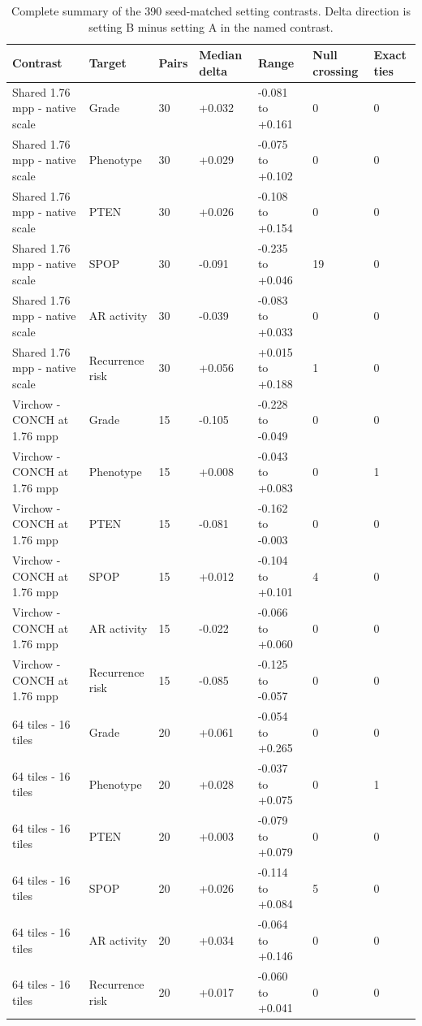 \begin{table}[H]
\centering
\scriptsize
\caption{Complete summary of the 390 seed-matched setting contrasts. Delta direction is setting B minus setting A in the named contrast.}
\label{tab:supp-contrast-summary}
\begin{tabular}{@{}p{}p{}p{}p{}p{}p{}p{}@{}}
\toprule
Contrast & Target & Pairs & Median delta & Range & Null crossing & Exact ties \\
\midrule
Shared 1.76 mpp - native scale & Grade & 30 & +0.032 & -0.081 to +0.161 & 0 & 0 \\
Shared 1.76 mpp - native scale & Phenotype & 30 & +0.029 & -0.075 to +0.102 & 0 & 0 \\
Shared 1.76 mpp - native scale & PTEN & 30 & +0.026 & -0.108 to +0.154 & 0 & 0 \\
Shared 1.76 mpp - native scale & SPOP & 30 & -0.091 & -0.235 to +0.046 & 19 & 0 \\
Shared 1.76 mpp - native scale & AR activity & 30 & -0.039 & -0.083 to +0.033 & 0 & 0 \\
Shared 1.76 mpp - native scale & Recurrence risk & 30 & +0.056 & +0.015 to +0.188 & 1 & 0 \\
Virchow - CONCH at 1.76 mpp & Grade & 15 & -0.105 & -0.228 to -0.049 & 0 & 0 \\
Virchow - CONCH at 1.76 mpp & Phenotype & 15 & +0.008 & -0.043 to +0.083 & 0 & 1 \\
Virchow - CONCH at 1.76 mpp & PTEN & 15 & -0.081 & -0.162 to -0.003 & 0 & 0 \\
Virchow - CONCH at 1.76 mpp & SPOP & 15 & +0.012 & -0.104 to +0.101 & 4 & 0 \\
Virchow - CONCH at 1.76 mpp & AR activity & 15 & -0.022 & -0.066 to +0.060 & 0 & 0 \\
Virchow - CONCH at 1.76 mpp & Recurrence risk & 15 & -0.085 & -0.125 to -0.057 & 0 & 0 \\
64 tiles - 16 tiles & Grade & 20 & +0.061 & -0.054 to +0.265 & 0 & 0 \\
64 tiles - 16 tiles & Phenotype & 20 & +0.028 & -0.037 to +0.075 & 0 & 1 \\
64 tiles - 16 tiles & PTEN & 20 & +0.003 & -0.079 to +0.079 & 0 & 0 \\
64 tiles - 16 tiles & SPOP & 20 & +0.026 & -0.114 to +0.084 & 5 & 0 \\
64 tiles - 16 tiles & AR activity & 20 & +0.034 & -0.064 to +0.146 & 0 & 0 \\
64 tiles - 16 tiles & Recurrence risk & 20 & +0.017 & -0.060 to +0.041 & 0 & 0 \\
\bottomrule
\end{tabular}
\end{table}
